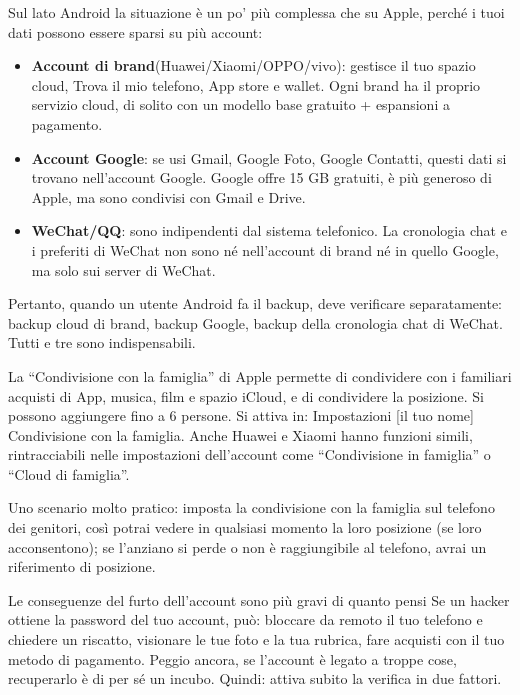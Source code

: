 
Sul lato Android la situazione è un po' più complessa che su Apple, perché i tuoi dati possono essere sparsi su più account:

\begin{itemize}
  \item \textbf{Account di brand}(Huawei/Xiaomi/OPPO/vivo): gestisce il tuo spazio cloud, Trova il mio telefono, App store e wallet. Ogni brand ha il proprio servizio cloud, di solito con un modello base gratuito + espansioni a pagamento.
  \item \textbf{Account Google}: se usi Gmail, Google Foto, Google Contatti, questi dati si trovano nell'account Google. Google offre 15 GB gratuiti, è più generoso di Apple, ma sono condivisi con Gmail e Drive.
  \item \textbf{WeChat/QQ}: sono indipendenti dal sistema telefonico. La cronologia chat e i preferiti di WeChat non sono né nell'account di brand né in quello Google, ma solo sui server di WeChat.
\end{itemize}

Pertanto, quando un utente Android fa il backup, deve verificare separatamente: backup cloud di brand, backup Google, backup della cronologia chat di WeChat. Tutti e tre sono indispensabili.


La “Condivisione con la famiglia” di Apple permette di condividere con i familiari acquisti di App, musica, film e spazio iCloud, e di condividere la posizione. Si possono aggiungere fino a 6 persone. Si attiva in: Impostazioni [il tuo nome] Condivisione con la famiglia. Anche Huawei e Xiaomi hanno funzioni simili, rintracciabili nelle impostazioni dell'account come “Condivisione in famiglia” o “Cloud di famiglia”.

Uno scenario molto pratico: imposta la condivisione con la famiglia sul telefono dei genitori, così potrai vedere in qualsiasi momento la loro posizione (se loro acconsentono); se l'anziano si perde o non è raggiungibile al telefono, avrai un riferimento di posizione.

\begin{tcbwarn}{Le conseguenze del furto dell'account sono più gravi di quanto pensi}
Se un hacker ottiene la password del tuo account, può: bloccare da remoto il tuo telefono e chiedere un riscatto, visionare le tue foto e la tua rubrica, fare acquisti con il tuo metodo di pagamento. Peggio ancora, se l'account è legato a troppe cose, recuperarlo è di per sé un incubo. Quindi: attiva subito la verifica in due fattori.

\end{tcbwarn}

